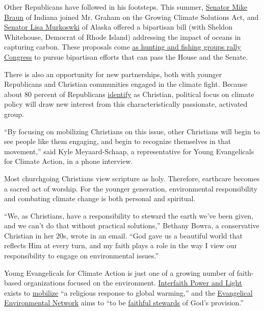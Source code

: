 Other Republicans have followed in his footsteps. This summer,
\href{https://www.braun.senate.gov/energy-202-two-gop-senators-join-democrats-back-bill-help-cut-emissions-farms}{Senator
Mike Braun} of Indiana joined Mr. Graham on the Growing Climate
Solutions Act, and
\href{https://www.murkowski.senate.gov/press/release/senators-introduce-bill-to-combat-impacts-of-climate-change-}{Senator
Lisa Murkoswki} of Alaska offered a bipartisan bill (with Sheldon
Whitehouse, Democrat of Rhode Island) addressing the impact of oceans in
capturing carbon. These proposals come
\href{https://www.washingtonpost.com/politics/2020/07/28/energy-202-hunting-fishing-groups-urge-congress-work-together-climate-change/}{as
hunting and fishing groups rally Congress} to pursue bipartisan efforts
that can pass the House and the Senate.

There is also an opportunity for new partnerships, both with younger
Republicans and Christian communities engaged in the climate fight.
Because about 80 percent of Republicans
\href{https://www.pewforum.org/religious-landscape-study/compare/christians/by/party-affiliation/}{identify}
as Christian, political focus on climate policy will draw new interest
from this characteristically passionate, activated group.

``By focusing on mobilizing Christians on this issue, other Christians
will begin to see people like them engaging, and begin to recognize
themselves in that movement,'' said Kyle Meyaard-Schaap, a
representative for Young Evangelicals for Climate Action, in a phone
interview.

Most churchgoing Christians view scripture as holy. Therefore, earthcare
becomes a sacred act of worship. For the younger generation,
environmental responsibility and combating climate change is both
personal and spiritual.

``We, as Christians, have a responsibility to steward the earth we've
been given, and we can't do that without practical solutions,'' Bethany
Bowra, a conservative Christian in her 20s, wrote in an email. ``God
gave us a beautiful world that reflects Him at every turn, and my faith
plays a role in the way I view our responsibility to engage on
environmental issues.''

Young Evangelicals for Climate Action is just one of a growing number of
faith-based organizations focused on the environment.
\href{https://www.interfaithpowerandlight.org/}{Interfaith Power and
Light} exists to
\href{https://www.interfaithpower.org/about-us/national-interfaith-power-light-campaign/}{mobilize}
``a religious response to global warming,'' and the
\href{https://creationcare.org/}{Evangelical Environmental Network} aims
to ``to be
\href{https://creationcare.org/who-we-are/mission.html}{faithful
stewards} of God's provision.''


